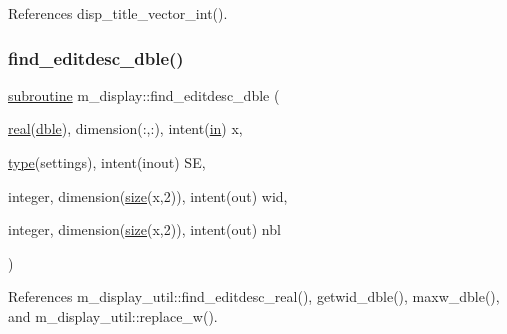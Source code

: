 References disp\+\_\+title\+\_\+vector\+\_\+int().

\mbox{\label{namespacem__display_a60a64829b11da65ab599a10719eea3cd}} 
\subsubsection{\texorpdfstring{find\+\_\+editdesc\+\_\+dble()}{find\_editdesc\_dble()}}
{\footnotesize\ttfamily \hyperlink{M__stopwatch_83_8txt_acfbcff50169d691ff02d4a123ed70482}{subroutine} m\+\_\+display\+::find\+\_\+editdesc\+\_\+dble (\begin{DoxyParamCaption}\item[{\hyperlink{read__watch_83_8txt_abdb62bde002f38ef75f810d3a905a823}{real}(\hyperlink{namespacem__display_a46d90b75b6ccef7ccade133e5847e815}{dble}), dimension(\+:,\+:), intent(\hyperlink{M__journal_83_8txt_afce72651d1eed785a2132bee863b2f38}{in})}]{x,  }\item[{\hyperlink{stop__watch_83_8txt_a70f0ead91c32e25323c03265aa302c1c}{type}(settings), intent(inout)}]{SE,  }\item[{integer, dimension(\hyperlink{what__overview_81_8txt_ab5692ed87074f1d5ec850a9ffa8b5af9}{size}(x,2)), intent(out)}]{wid,  }\item[{integer, dimension(\hyperlink{what__overview_81_8txt_ab5692ed87074f1d5ec850a9ffa8b5af9}{size}(x,2)), intent(out)}]{nbl }\end{DoxyParamCaption})\hspace{0.3cm}{\ttfamily [private]}}



References m\+\_\+display\+\_\+util\+::find\+\_\+editdesc\+\_\+real(), getwid\+\_\+dble(), maxw\+\_\+dble(), and m\+\_\+display\+\_\+util\+::replace\+\_\+w().

\mbox{\label{namespacem__display_ab6e1e0eb1c077b4d2a0c6698c78925a3}} 
